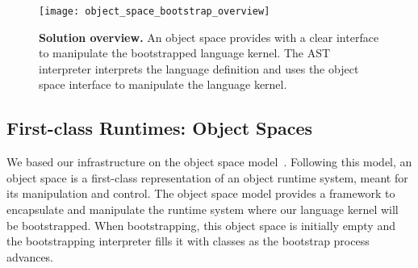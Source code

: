 %

\begin{figure}[ht]
\center
\texttt{[image: object\_space\_bootstrap\_overview]}
\caption{\textbf{Solution overview.} An object space provides with a clear interface to manipulate the bootstrapped language kernel. The AST interpreter interprets the language definition and uses the object space interface to manipulate the language kernel.\label{fig:objectSpaceOverview}}
\end{figure}


\subsection{First-class Runtimes: Object Spaces}\label{section:object_spaces}

We based our infrastructure on the object space model~\cite{Poli13a}. Following this model, an object space is a first-class representation of an object runtime system, meant for its manipulation and control. The object space model provides a framework to encapsulate and manipulate the runtime system where our language kernel will be bootstrapped. When bootstrapping, this object space is initially empty and the bootstrapping interpreter fills it with classes as the bootstrap process advances.

